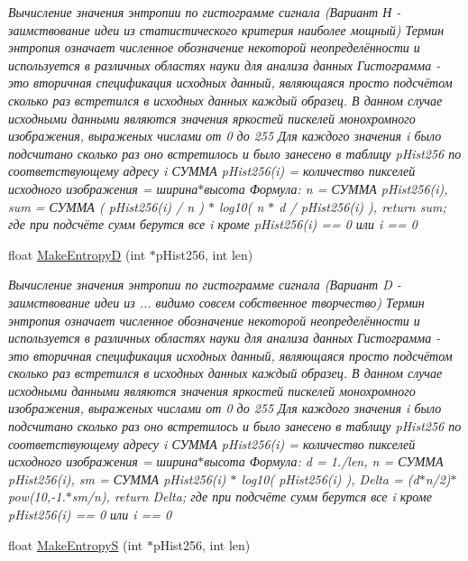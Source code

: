 \begin{DoxyCompactItemize}
\begin{DoxyCompactList}\small\item\em Вычисление значения энтропии по гистограмме сигнала (Вариант Н -\/ заимствование идеи из статистического критерия наиболее мощный) Термин энтропия означает численное обозначение некоторой неопределённости и используется в различных областях науки для анализа данных Гистограмма -\/ это вторичная спецификация исходных данный, являющаяся просто подсчётом сколько раз встретился в исходных данных каждый образец. В данном случае исходными данными являются значения яркостей пискелей монохромного изображения, выраженых числами от 0 до 255 Для каждого значения i было подсчитано сколько раз оно встретилось и было занесено в таблицу p\+Hist256 по соответствующему адресу i СУММА p\+Hist256(i) = количество пикселей исходного изображения = ширина$\ast$высота Формула\+: n = СУММА p\+Hist256(i), sum = СУММА ( p\+Hist256(i) / n ) $\ast$ log10( n $\ast$ d / p\+Hist256(i) ), return sum; где при подсчёте сумм берутся все i кроме p\+Hist256(i) == 0 или i == 0 \end{DoxyCompactList}\item 
float \hyperlink{class_c_v_i_engine_base_a4a6d774f1ebf9e8bf595c3e3e60f06a7}{Make\+Entropy\+D} (int $\ast$p\+Hist256, int len)
\begin{DoxyCompactList}\small\item\em Вычисление значения энтропии по гистограмме сигнала (Вариант D -\/ заимствование идеи из ... видимо совсем собственное творчество) Термин энтропия означает численное обозначение некоторой неопределённости и используется в различных областях науки для анализа данных Гистограмма -\/ это вторичная спецификация исходных данный, являющаяся просто подсчётом сколько раз встретился в исходных данных каждый образец. В данном случае исходными данными являются значения яркостей пискелей монохромного изображения, выраженых числами от 0 до 255 Для каждого значения i было подсчитано сколько раз оно встретилось и было занесено в таблицу p\+Hist256 по соответствующему адресу i СУММА p\+Hist256(i) = количество пикселей исходного изображения = ширина$\ast$высота Формула\+: d = 1./len, n = СУММА p\+Hist256(i), sm = СУММА p\+Hist256(i) $\ast$ log10( p\+Hist256(i) ), Delta = (d$\ast$n/2)$\ast$pow(10,-\/1.$\ast$sm/n), return Delta; где при подсчёте сумм берутся все i кроме p\+Hist256(i) == 0 или i == 0 \end{DoxyCompactList}\item 
float \hyperlink{class_c_v_i_engine_base_aa13baee159190df5a7fb94bb58f55065}{Make\+Entropy\+S} (int $\ast$p\+Hist256, int len)

\end{DoxyCompactItemize}
